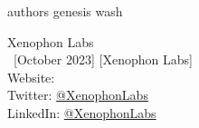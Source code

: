 \documentclass[
        a4paper, %
	8pt, %
]{CSSullivanBusinessReport}
\begin{document}

\newpage

\pagecolor{white}
\color{black}

\begin{appendices}

    {authors}
    \newpage
    {genesis}
    \newpage
    {wash}
\end{appendices}


\newpage

\pagecolor{bg}
\color{white}

\thispagestyle{empty} %

\begin{fullwidth} %
	\vspace*{-0.075\textheight} %
	\vspace{0.9\textheight} %
        {\LARGE Xenophon Labs}\\
        \vspace{0.2cm}
        \small
	\textcopyright~[October 2023] [Xenophon Labs] \\
        \vspace{1cm}
        Website: \\
        \vspace{0.2cm}
        Twitter: \href{https://twitter.com/XenophonLabs}{@XenophonLabs}\\
        \vspace{0.2cm}
        LinkedIn: \href{https://www.linkedin.com/company/xenophon-labs/about/}{@XenophonLabs}\\
\end{fullwidth}
\end{document}
